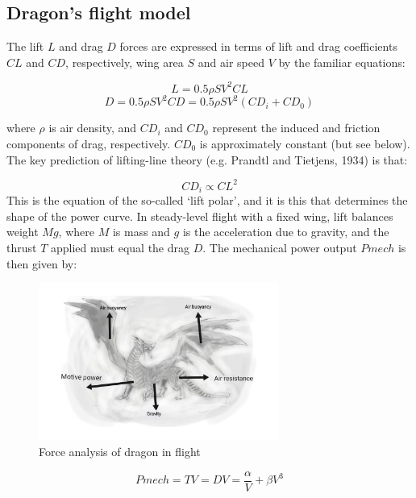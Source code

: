\documentclass[12pt]{article}  %
\newenvironment{shrinkeq}[1]
{ \bgroup
	\addtolength\abovedisplayshortskip{#1}
	\addtolength\abovedisplayskip{#1}
	\addtolength\belowdisplayshortskip{#1}
	\addtolength\belowdisplayskip{#1}}
{\egroup\ignorespacesafterend}
\begin{document}
\subsection{Dragon's flight model}
The lift $L$ and drag $D$ forces are expressed in terms of lift and drag coefficients $CL$ and $CD$, respectively, wing area $S$ and air speed $V$ by the familiar equations: 

\begin{shrinkeq}{-1ex}
	\begin{equation}
    \label{eq:eq7}
	  L = 0.5\rho SV^2CL 
	\end{equation}
\end{shrinkeq}
\vspace{-0.2 cm}
\begin{shrinkeq}{-1ex}
	\begin{equation}
    \label{eq:eq8}
	   D = 0.5\rho SV^2CD = 0.5\rho SV^2(CD_i + CD_0)
	\end{equation}
\end{shrinkeq}

where $\rho$ is air density, and $CD_i$ and $CD_0$ represent the induced 
and friction components of drag, respectively. $CD_0$ is approximately constant (but see below). The key prediction of lifting-line theory (e.g. Prandtl and Tietjens, 1934) is that: 

\begin{shrinkeq}{-1ex}
	\begin{equation}
    \label{eq:eq9}
	   CD_i \propto CL^2
	\end{equation}
\end{shrinkeq}
This is the equation of the so-called ‘lift polar’, and it is this that determines the shape of the power curve. In steady-level flight with a fixed wing, lift balances weight $Mg$, where $M$ is mass and $g$ is the acceleration due to gravity, and the thrust $T$ applied must equal the drag $D$. The mechanical power output $Pmech$ is then given by: 
\begin{figure}[h]
	\centering
	\includegraphics[width=0.7\textwidth]{easymcm/img/ab.pdf}
	\caption{Force analysis of dragon in flight
}
\end{figure}
\begin{shrinkeq}{-1ex}
	\begin{equation}
    \label{eq:eq10}
	   Pmech = TV = DV = \frac{\alpha}{V} + \beta V^3
	\end{equation}
\end{shrinkeq}
\end{document}
